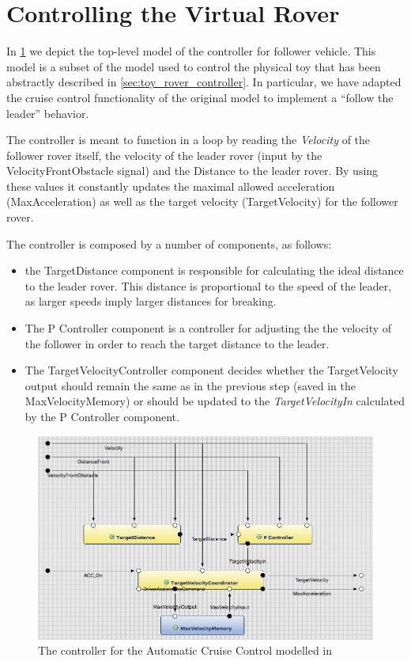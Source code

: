 \section{Controlling the Virtual Rover}

In \fig\ref{fig:acc_model} we depict the top-level model of the controller for
follower vehicle. This model is a subset of the model used to control the
physical toy that has been abstractly described in
\sect\ref{sec:toy_rover_controller}. In particular, we have adapted the cruise
control functionality of the original model to implement a ``follow the leader''
behavior.

The controller is meant to function in a loop by reading the
\emph{Velocity} of the follower rover itself, the velocity of the leader rover
(input by the \textsf{VelocityFrontObstacle} signal) and the \textsf{Distance} to
the leader rover. By using these values it constantly updates the maximal
allowed acceleration (\textsf{MaxAcceleration}) as well as
the target velocity (\textsf{TargetVelocity}) for the follower rover.

The controller is composed by a number of \af components, as follows:
\begin{itemize}
  \item the \textsf{TargetDistance} component is responsible for calculating the
  ideal distance to the leader rover. This distance is proportional to the speed of
the leader, as larger speeds imply larger distances for breaking. 
  \item The \textsf{P Controller} component is a \pid controller for adjusting
  the the velocity of the follower in order to reach the target distance to the
leader.
\item The \textsf{TargetVelocityController} component decides whether the
\textsf{TargetVelocity} output should remain the same as in the previous step
(saved in the \textsf{MaxVelocityMemory}) or should be updated to the
\emph{TargetVelocityIn} calculated by the \textsf{P Controller} component.
\end{itemize}

\begin{figure}[!h]
\centering
\includegraphics[width=1\textwidth]{images/ACC_controller_model.png}
\caption{The controller for the Automatic Cruise Control modelled in \af}
\label{fig:acc_model}
\end{figure}

